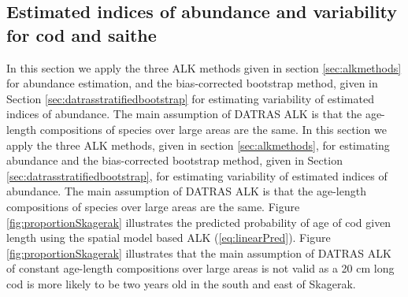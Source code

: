 \documentclass[a4paper 12pt]{article}
\numberwithin{equation}{section}
\begin{document}
\subsection{Estimated indices of abundance and variability for cod and saithe}
\label{sec:codresults}
In this section we apply the three ALK methods given in section \ref{sec:alkmethods} for abundance estimation, and the bias-corrected bootstrap method, given in Section \ref{sec:datrasstratifiedbootstrap} for estimating variability of estimated indices of abundance. The main assumption of DATRAS ALK is that the age-length compositions of species over large areas are the same. In this section we apply the three ALK methods, given in section \ref{sec:alkmethods}, for estimating abundance and the bias-corrected bootstrap method, given in Section \ref{sec:datrasstratifiedbootstrap}, for estimating variability of estimated indices of abundance.  The main assumption of DATRAS ALK is that the age-length compositions of species over large areas are the same. Figure \ref{fig:proportionSkagerak} illustrates the predicted probability of age of cod given length using the spatial model based ALK  (\ref{eq:linearPred}).  Figure \ref{fig:proportionSkagerak} illustrates that the main assumption of DATRAS ALK of constant age-length compositions over large areas is not valid as a 20 cm long cod is more likely to be two years old in the south and east of Skagerak.
\clearpage
\end{document}
